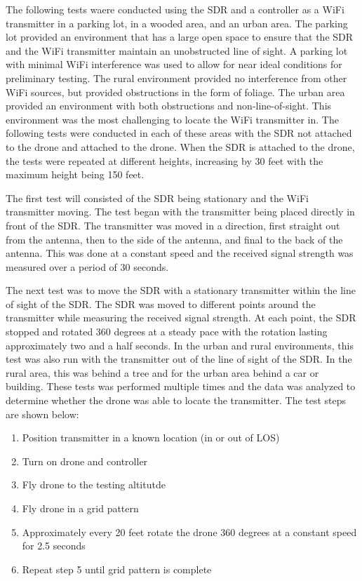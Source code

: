 The following tests waere conducted using the SDR and a controller as a WiFi transmitter in a parking lot, in a wooded area, and an urban area. The parking lot provided an environment that has a large open space to ensure that the SDR and the WiFi transmitter maintain an unobstructed line of sight. A parking lot with minimal WiFi interference was used to allow for near ideal conditions for preliminary testing. The rural environment provided no interference from other WiFi sources, but provided obstructions in the form of foliage. The urban area provided an environment with both obstructions and non-line-of-sight. This environment was the most challenging to locate the WiFi transmitter in. The following tests were conducted in each of these areas with the SDR not attached to the drone and attached to the drone. When the SDR is attached to the drone, the tests were repeated at different heights, increasing by 30 feet with the maximum height being 150 feet.\par 
The first test will consisted of the SDR being stationary and the WiFi transmitter moving. The test began with the transmitter being placed directly in front of the SDR. The transmitter was moved in a direction, first straight out from the antenna, then to the side of the antenna, and final to the back of the antenna. This was done at a constant speed and the received signal strength was measured over a period of 30 seconds.\par 
The next test was to move the SDR with a stationary transmitter within the line of sight of the SDR. The SDR was moved to different points around the transmitter while measuring the received signal strength. At each point, the SDR stopped and rotated 360 degrees at a steady pace with the rotation lasting approximately two and a half seconds. In the urban and rural environments, this test was also run with the transmitter out of the line of sight of the SDR. In the rural area, this was behind a tree and for the urban area behind a car or building. These tests was performed multiple times and the data was analyzed to determine whether the drone was able to locate the transmitter. The test steps are shown below: \par 

\begin{enumerate}
   \item Position transmitter in a known location (in or out of LOS)
   \item Turn on drone and controller
   \item Fly drone to the testing altitutde
   \item Fly drone in a grid pattern
   \item Approximately every 20 feet rotate the drone 360 degrees at a constant speed for 2.5 seconds
   \item Repeat step 5 until grid pattern is complete
\end{enumerate} \par


